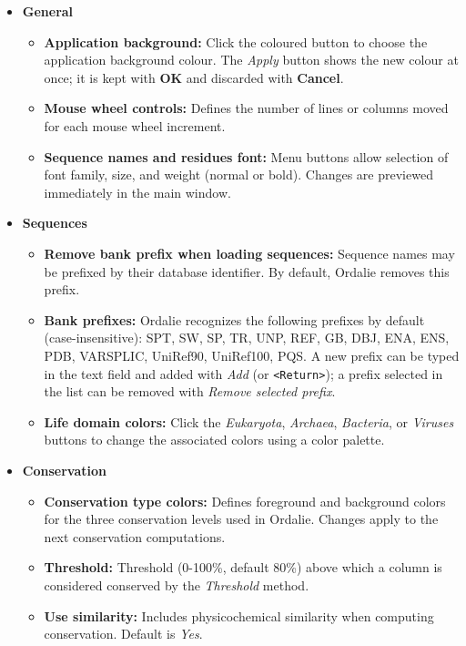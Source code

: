 \documentclass[a4paper]{article}
\begin{document}
\begin{itemize}
\item \textbf{General}
\begin{itemize}
\item \textbf{Application background:} Click the coloured button to choose the application background colour. The \textit{Apply} button shows the new colour at once; it is kept with \textbf{OK} and discarded with \textbf{Cancel}.
\item \textbf{Mouse wheel controls:} Defines the number of lines or columns moved for each mouse wheel increment.
\item \textbf{Sequence names and residues font:} Menu buttons allow selection of font family, size, and weight (normal or bold). Changes are previewed immediately in the main window.
\end{itemize}

\item \textbf{Sequences}
\begin{itemize}
\item \textbf{Remove bank prefix when loading sequences:} Sequence names may be prefixed by their database identifier. By default, Ordalie removes this prefix.
\item \textbf{Bank prefixes:} Ordalie recognizes the following prefixes by default (case-insensitive): SPT, SW, SP, TR, UNP, REF, GB, DBJ, ENA, ENS, PDB, VARSPLIC, UniRef90, UniRef100, PQS. A new prefix can be typed in the text field and added with \textit{Add} (or \texttt{<Return>}); a prefix selected in the list can be removed with \textit{Remove selected prefix}.
\item \textbf{Life domain colors:} Click the \textit{Eukaryota}, \textit{Archaea}, \textit{Bacteria}, or \textit{Viruses} buttons to change the associated colors using a color palette.
\end{itemize}

\item \textbf{Conservation}
\begin{itemize}
\item \textbf{Conservation type colors:} Defines foreground and background colors for the three conservation levels used in Ordalie. Changes apply to the next conservation computations.
\item \textbf{Threshold:} Threshold (0-100\%, default 80\%) above which a column is considered conserved by the \textit{Threshold} method.
\item \textbf{Use similarity:} Includes physicochemical similarity when computing conservation. Default is \textit{Yes}.
\end{itemize}


\end{itemize}
\end{document}
